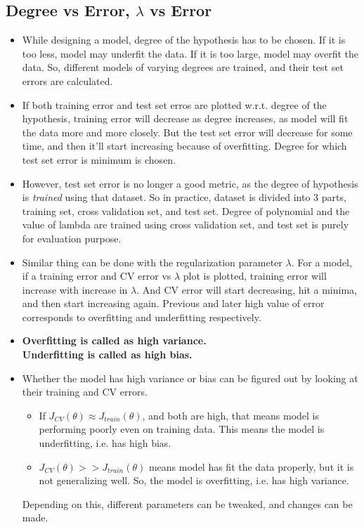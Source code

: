 \documentclass{article}
\begin{document}
\subsection{Degree vs Error, $\lambda$ vs Error}
\begin{itemize}
	\item While designing a model, degree of the hypothesis has to be chosen. If it is too less, model may underfit the data. If it is too large, model may overfit the data. So, different models of varying degrees are trained, and their test set errors are calculated.
	\item If both training error and test set erros are plotted w.r.t. degree of the hypothesis, training error will decrease as degree increases, as model will fit the data more and more closely. But the test set error will decrease for some time, and then it'll start increasing because of overfitting. Degree for which test set error is minimum is chosen.
	\item However, test set error is no longer a good metric, as the degree of hypothesis is \emph{trained} using that dataset. So in practice, dataset is divided into 3 parts, training set, cross validation set, and test set. Degree of polynomial and the value of lambda are trained using cross validation set, and test set is purely for evaluation purpose.
	\item Similar thing can be done with the regularization parameter $\lambda$. For a model, if a training error and CV error vs $\lambda$ plot is plotted, training error will increase with increase in $\lambda$. And CV error will start decreasing, hit a minima, and then start increasing again. Previous and later high value of error corresponds to overfitting and underfitting respectively.
	\item {\textbf{Overfitting is called as high variance.}}
	\\{\textbf{Underfitting is called as high bias.}}
	\item Whether the model has high variance or bias can be figured out by looking at their training and CV errors.\begin{itemize}
		\item If $J_{CV}(\theta) \approx J_{train}(\theta)$, and both are high, that means model is performing poorly even on training data. This means the model is underfitting, i.e. has high bias.
		\item $J_{CV}(\theta) >> J_{train}(\theta)$ means model has fit the data properly, but it is not generalizing well. So, the model is overfitting, i.e. has high variance.
	\end{itemize}
	Depending on this, different parameters can be tweaked, and changes can be made.
\end{itemize}
\end{document}
